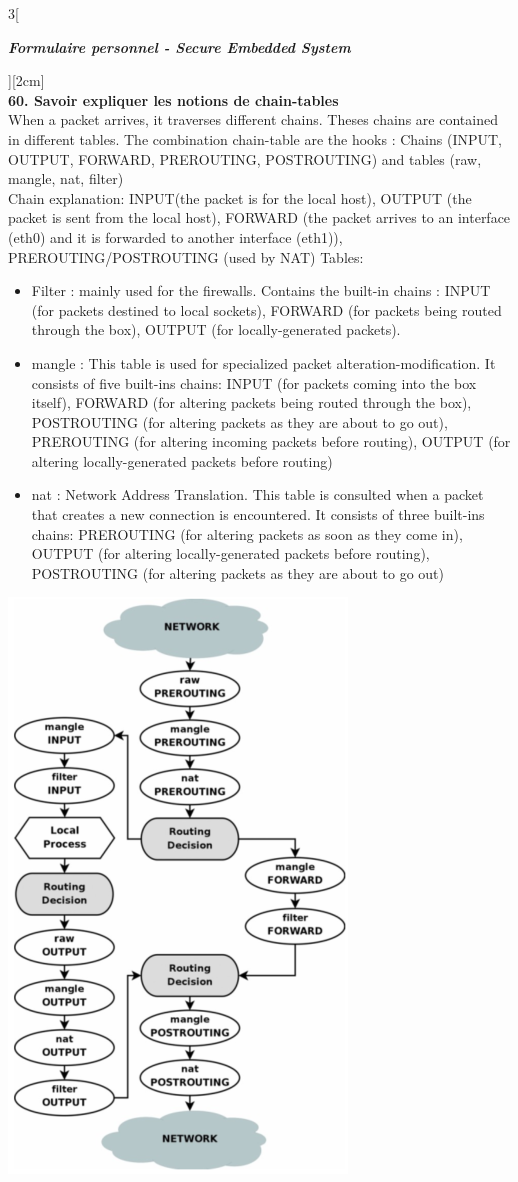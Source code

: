 \begin{multicols}{3}[\centerline{ \large\em \textbf{Formulaire personnel - Secure Embedded System}}][2cm]
\\ \textbf{60. Savoir expliquer les notions de chain-tables\\}
When a packet arrives, it traverses different chains. Theses chains are contained in different tables. The combination chain-table are the hooks : Chains (INPUT, OUTPUT, FORWARD, PREROUTING, POSTROUTING) and tables (raw, mangle, nat, filter)\\
Chain explanation: INPUT(the packet is for the local host), OUTPUT (the packet is sent from the local host), FORWARD (the packet arrives to an interface (eth0) and it is forwarded to another interface (eth1)), PREROUTING/POSTROUTING (used by NAT)
Tables:
\begin{itemize}
\item Filter : mainly used for the firewalls. Contains the built-in chains : INPUT (for packets destined to local sockets), FORWARD (for packets being routed through the box), OUTPUT (for locally-generated packets).
\item mangle : This table is used for specialized packet alteration-modification. It consists of five built-ins chains: INPUT (for packets coming into the box itself), FORWARD (for altering packets being routed through
the box), POSTROUTING (for altering packets as they are about
to go out), PREROUTING (for altering incoming packets before
routing), OUTPUT (for altering locally-generated packets before
routing)
\item nat : Network Address Translation. This table is consulted when a packet that creates a new connection is encountered. It consists of three built-ins chains: PREROUTING (for altering packets as soon as they come in), OUTPUT (for altering locally-generated packets before routing), POSTROUTING (for altering packets as they are about to go out)
\end{itemize}
\begin{minipage}{\linewidth}
	\centering
    \includegraphics[width =0.4\columnwidth, angle = 90]{images/42.png}

\end{minipage}
\end{multicols}
